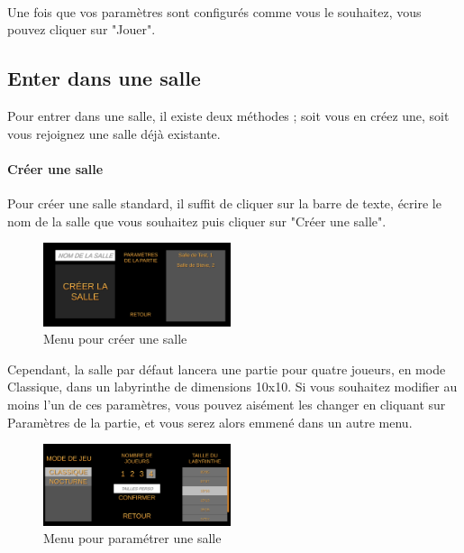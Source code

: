 \documentclass{article}
\begin{document}
\paragraph{}
Une fois que vos paramètres sont configurés comme vous le souhaitez, vous pouvez cliquer sur "Jouer".

\subsection{Enter dans une salle}
Pour entrer dans une salle, il existe deux méthodes ; soit vous en créez une, soit vous rejoignez une salle déjà existante.

\paragraph{Créer une salle}
Pour créer une salle standard, il suffit de cliquer sur la barre de texte, écrire le nom de la salle que vous souhaitez puis cliquer sur "Créer une salle".

\begin{figure}[H]
	\centering
	\includegraphics[width=0.49\textwidth]{Menu1.png}
	\caption{Menu pour créer une salle}
	\label{Menu pour créer une salle}
\end{figure}

Cependant, la salle par défaut lancera une partie pour quatre joueurs, en mode Classique, dans un labyrinthe de dimensions 10x10.
Si vous souhaitez modifier au moins l'un de ces paramètres, vous pouvez aisément les changer en cliquant sur Paramètres de la partie, et vous serez alors emmené dans un autre menu.

\begin{figure}[H]
	\centering
	\includegraphics[width=0.49\textwidth]{Menu2.png}
	\caption{Menu pour paramétrer une salle}
	\label{Menu pour paramétrer une salle}
\end{figure}
\end{document}
